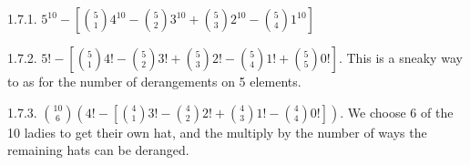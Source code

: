  \protect {} \protect \begin {itemize} 
\begin{ans}{1.7.1.}
	$5^{10} - \left[{5 \choose 1}4^{10} - {5 \choose 2}3^{10} + {5 \choose 3}2^{10} - {5 \choose 4}1^{10}\right]$ %
	
\end{ans}
\begin{ans}{1.7.2.}
	$5! - \left[{5 \choose 1}4! - {5 \choose 2}3! + {5 \choose 3}2! - {5 \choose 4}1! + {5 \choose 5}0!\right]$.  This is a sneaky way to as for the number of derangements on 5 elements. %
	
\end{ans}
\begin{ans}{1.7.3.}
	${10 \choose 6}\left(4! - \left[{4 \choose 1} 3! - {4 \choose 2}2! + {4 \choose 3}1! - {4 \choose 4}0!\right]\right)$.  We choose 6 of the 10 ladies to get their own hat, and the multiply by the number of ways the remaining hats can be deranged.
	
\end{ans}
\protect \end {itemize}
